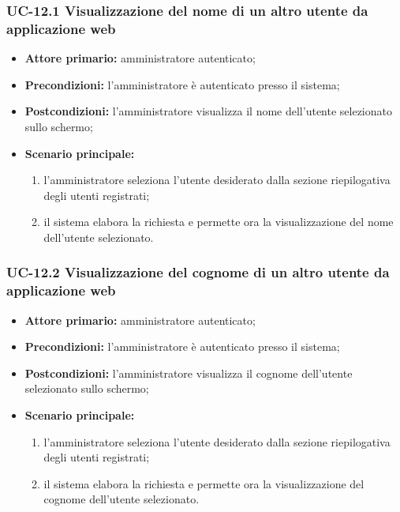 \subsubsection{UC-12.1 Visualizzazione del nome di un altro utente da applicazione web}
\begin{itemize}
	\item \textbf{Attore primario:} amministratore autenticato;

	\item \textbf{Precondizioni:} l'amministratore è autenticato presso il sistema;

	\item \textbf{Postcondizioni:} l'amministratore visualizza il nome dell'utente selezionato sullo schermo;

	\item \textbf{Scenario principale:}
	\begin{enumerate}
   		 \item  l'amministratore seleziona l'utente desiderato dalla sezione riepilogativa degli utenti registrati;
    	 \item  il sistema elabora la richiesta e permette ora la visualizzazione del nome dell'utente selezionato.
	\end{enumerate}
\end{itemize}

\subsubsection{UC-12.2 Visualizzazione del cognome di un altro utente da applicazione web}
\begin{itemize}
	\item \textbf{Attore primario:} amministratore autenticato;

	\item \textbf{Precondizioni:} l'amministratore è autenticato presso il sistema;

	\item \textbf{Postcondizioni:} l'amministratore visualizza il cognome dell'utente selezionato sullo schermo;

	\item \textbf{Scenario principale:}
		\begin{enumerate}
   			 \item  l'amministratore seleziona l'utente desiderato dalla sezione riepilogativa degli utenti registrati;
    		 \item  il sistema elabora la richiesta e permette ora la visualizzazione del cognome dell'utente selezionato.
		\end{enumerate}
\end{itemize}

